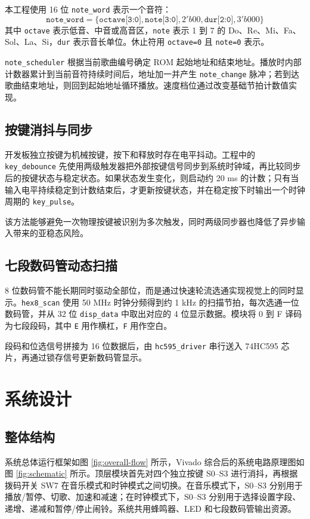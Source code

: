\documentclass[UTF8,a4paper,12pt]{ctexart}
\begin{document}
本工程使用 16 位 \verb|note_word| 表示一个音符：
\[
\texttt{note\_word}=\{\texttt{octave[3:0]},\texttt{note[3:0]},2'b00,\texttt{dur[2:0]},3'b000\}
\]
其中 \verb|octave| 表示低音、中音或高音区，\verb|note| 表示 1 到 7 的 Do、Re、Mi、Fa、Sol、La、Si，\verb|dur| 表示音长单位。休止符用 \verb|octave=0| 且 \verb|note=0| 表示。

\verb|note_scheduler| 根据当前歌曲编号确定 ROM 起始地址和结束地址。播放时内部计数器累计到当前音符持续时间后，地址加一并产生 \verb|note_change| 脉冲；若到达歌曲结束地址，则回到起始地址循环播放。速度档位通过改变基础节拍计数值实现。

\subsection{按键消抖与同步}

开发板独立按键为机械按键，按下和释放时存在电平抖动。工程中的 \verb|key_debounce| 先使用两级触发器把外部按键信号同步到系统时钟域，再比较同步后的按键状态与稳定状态。如果状态发生变化，则启动约 20 ms 的计数；只有当输入电平持续稳定到计数结束后，才更新按键状态，并在稳定按下时输出一个时钟周期的 \verb|key_pulse|。

该方法能够避免一次物理按键被识别为多次触发，同时两级同步器也降低了异步输入带来的亚稳态风险。

\subsection{七段数码管动态扫描}

8 位数码管不能长期同时驱动全部位，而是通过快速轮流选通实现视觉上的同时显示。\verb|hex8_scan| 使用 50 MHz 时钟分频得到约 1 kHz 的扫描节拍，每次选通一位数码管，并从 32 位 \verb|disp_data| 中取出对应的 4 位显示数据。模块将 0 到 F 译码为七段段码，其中 \verb|E| 用作横杠，\verb|F| 用作空白。

段码和位选信号拼接为 16 位数据后，由 \verb|hc595_driver| 串行送入 74HC595 芯片，再通过锁存信号更新数码管显示。

\section{系统设计}

\subsection{整体结构}

系统总体运行框架如图 \ref{fig:overall-flow} 所示，Vivado 综合后的系统电路原理图如图 \ref{fig:schematic} 所示。顶层模块首先对四个独立按键 S0--S3 进行消抖，再根据拨码开关 SW7 在音乐模式和时钟模式之间切换。在音乐模式下，S0--S3 分别用于播放/暂停、切歌、加速和减速；在时钟模式下，S0--S3 分别用于选择设置字段、递增、递减和暂停/停止闹铃。系统共用蜂鸣器、LED 和七段数码管输出资源。
\end{document}
